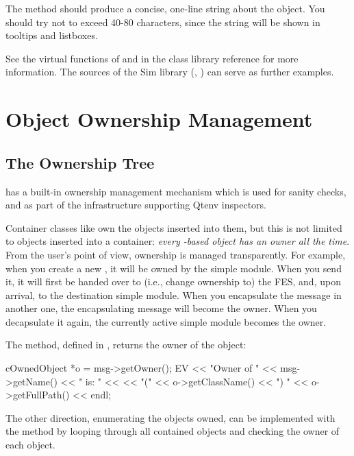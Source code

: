 The  method should produce a concise, one-line string
about the object. You should try not to exceed 40-80 characters, since the
string will be shown in tooltips and listboxes.

See the virtual functions of  and 
in the class library reference for more information. The sources of the
Sim library (, ) can serve as further examples.



\section{Object Ownership Management}
\label{sec:sim-lib:ownership-management}

\subsection{The Ownership Tree}
\label{sec:sim-lib:ownership-tree}

{\opp} has a built-in ownership management mechanism which
is used for sanity checks, and as part of the infrastructure
supporting Qtenv inspectors.

Container classes like  own the objects inserted
into them, but this is not limited to objects inserted into a container:
\textit{every -based object has an owner all the time}.
From the user's point of view, ownership is managed transparently.
For example, when you create a new ,
it will be owned by the simple module. When you send it, it will
first be handed over to (i.e., change ownership to) the FES, and,
upon arrival, to the destination simple module. When you encapsulate
the message in another one, the encapsulating message will become
the owner. When you decapsulate it again, the currently active
simple module becomes the owner.

The  method, defined in , returns the
owner of the object:

\begin{cpp}
cOwnedObject *o = msg->getOwner();
EV << "Owner of " << msg->getName() << " is: " <<
   << "(" << o->getClassName() << ") " << o->getFullPath() << endl;
\end{cpp}

The other direction, enumerating the objects owned, can be implemented with
the  method by looping through all
contained objects and checking the owner of each object.

